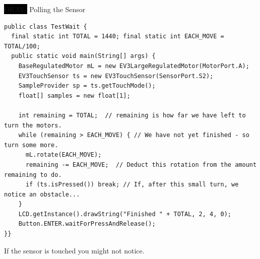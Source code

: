 \documentclass[color=pdftex,usenames,dvipsnames, aspectratio=169]{beamer}
\begin{document}
\begin{frame}[fragile]{\colorbox{black}{\color{amber}OKAY:} Polling the Sensor}
\begin{lstlisting}[basicstyle=\ttfamily\scriptsize\color{blue}]
public class TestWait {
  final static int TOTAL = 1440; final static int EACH_MOVE = TOTAL/100;
  public static void main(String[] args) {
    BaseRegulatedMotor mL = new EV3LargeRegulatedMotor(MotorPort.A);
    EV3TouchSensor ts = new EV3TouchSensor(SensorPort.S2);
    SampleProvider sp = ts.getTouchMode();
    float[] samples = new float[1];

    int remaining = TOTAL;  // remaining is how far we have left to turn the motors.
    while (remaining > EACH_MOVE) { // We have not yet finished - so turn some more.
      mL.rotate(EACH_MOVE);
      remaining -= EACH_MOVE;  // Deduct this rotation from the amount remaining to do.
      if (ts.isPressed()) break; // If, after this small turn, we notice an obstacle...
    }
    LCD.getInstance().drawString("Finished " + TOTAL, 2, 4, 0);
    Button.ENTER.waitForPressAndRelease();
}}
\end{lstlisting}
\alert{If the sensor is touched you might not notice.}
\end{frame}
\end{document}
